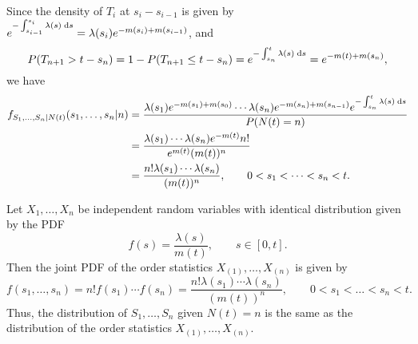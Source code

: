 \documentclass{homework}
\begin{document}
\begin{alphaparts}
		Since the density of $T_i$ at $s_i - s_{i-1}$ is given by $e^{-\int_{s_{i-1}}^{s_i}\lambda(s)\;\text{d} s} = \lambda(s_i)e^{-m(s_i) + m(s_{i-1})}$, and 
		\begin{equation*}
			P(T_{n+1} > t - s_n) = 1 - P(T_{n+1} \le t-s_{n}) = e^{-\int_{s_n}^t \lambda(s)\;\text{d} s} = e^{-m(t)+m(s_n)},
		\end{equation*}
		we have
		\begin{align*}
			f_{S_1,\dots,S_n|N(t)}(s_1,\dots, s_n|n) &= \frac{\lambda(s_1)e^{-m(s_1) + m(s_0)} \cdots \lambda(s_n)e^{-m(s_n)+m(s_{n-1})}e^{-\int_{s_n}^t \lambda(s)\;\text{d} s}}{P(N(t)=n)} \\
			&= \frac{\lambda(s_1)\cdots\lambda(s_n)e^{-m(t)}n!}{e^{m(t)}(m(t))^n} \\
			&= \frac{n!\lambda(s_1)\cdots\lambda(s_n)}{(m(t))^n}, \qquad 0 < s_1 < \dots < s_n < t.
		\end{align*}
		
		\questionpart Let $X_1, \dots, X_n$ be independent random variables with identical distribution given by the PDF
		\begin{equation*}
			f(s) = \frac{\lambda(s)}{m(t)}, \qquad s \in [0, t].
		\end{equation*}
		Then the joint PDF of the order statistics $X_{(1)}, \dots, X_{(n)}$ is given by
		\begin{equation*}
			f(s_1, \dots, s_n) = n!f(s_1)\cdots f(s_n) = \frac{n!\lambda(s_1)\cdots \lambda(s_n)}{(m(t))^n}, \qquad 0 < s_1 < \dots < s_n < t.
		\end{equation*}
		Thus, the distribution of $S_1, \dots, S_n$ given $N(t) = n$ is the same as the distribution of the order statistics $X_{(1)}, \dots, X_{(n)}$.
	\end{alphaparts}
	
\end{document}
